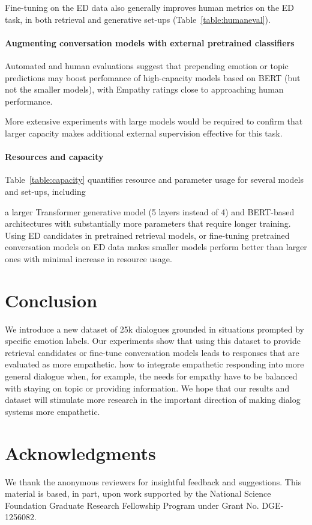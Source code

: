 \documentclass[11pt,a4paper]{article}
\newcommand\datasetabbrev{ED}
\begin{document}
Fine-tuning on the \datasetabbrev{} data also generally improves human metrics on the ED task, in both retrieval and generative set-ups (Table~\ref{table:humaneval}).


\paragraph{Augmenting conversation models with external pretrained classifiers}
Automated and human evaluations suggest that prepending emotion or topic predictions may boost perfomance of high-capacity models based on BERT (but not the smaller models), with Empathy ratings close to approaching human performance.

More extensive experiments with large models would be required to confirm that larger capacity makes additional external supervision effective for this task.


\paragraph{Resources and capacity}
Table~\ref{table:capacity} quantifies resource and parameter usage for several models and set-ups, including


a larger Transformer generative model (5 layers instead of 4) and
 BERT-based architectures with substantially more parameters that require longer training.
Using ED candidates in pretrained retrieval models, or fine-tuning pretrained conversation models on
ED data makes smaller models perform better than larger ones with minimal increase in resource usage.






\section{Conclusion}
We introduce a new dataset of 25k dialogues grounded in situations prompted by specific emotion labels.  
Our experiments show that using this dataset to provide retrieval candidates or fine-tune
conversation models leads to responses that are evaluated as more empathetic. 
how to integrate empathetic responding into more general dialogue when, for example, the needs for empathy have to be balanced with staying on topic or providing information. 
We hope that our results and dataset will stimulate more research in the important direction of making dialog systems more empathetic.

\section*{Acknowledgments}
We thank the anonymous reviewers for insightful feedback and suggestions. This material is based, in part, upon work supported by the National Science Foundation Graduate Research Fellowship Program under Grant No. DGE-1256082.




\clearpage
\appendix

\end{document}
